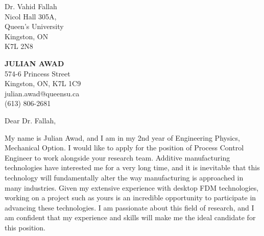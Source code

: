 \documentclass[11pt]{letter} %
\begin{document}
\begin{letter}{Dr. Vahid Fallah \\
Nicol Hall 305A, \\
Queen's University \\
Kingston, ON \\
K7L 2N8}

\begin{center}
\textbf{\huge JULIAN AWAD} \\ %
\vspace{1em} %
574-6 Princess Street \\ Kingston, ON, K7L 1C9 \\ julian.awad@queensu.ca \\ (613) 806-2681 %
\end{center}
\hspace{2em}
\signature{Julian Awad} %
\vspace{-0.3in}
\opening{Dear Dr. Fallah,}

My name is Julian Awad, and I am in my 2nd year of Engineering Physics, Mechanical Option. I would like to apply for the position of Process Control Engineer to work alongside your research team. Additive manufacturing technologies have interested me for a very long time, and it is inevitable that this technology will fundamentally alter the way manufacturing is approached in many industries. Given my extensive experience with desktop FDM technologies, working on a project such as yours is an incredible opportunity to participate in advancing these technologies. I am passionate about this field of research, and I am confident that my experience and skills will make me the ideal candidate for this position.


\end{letter}
\end{document}

